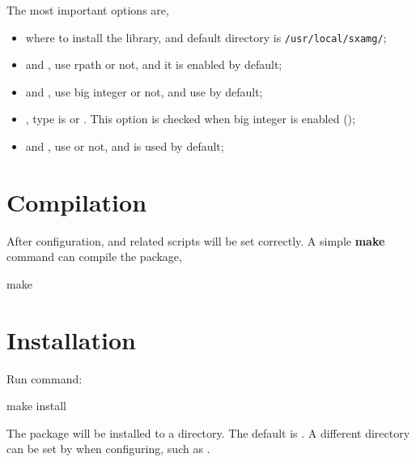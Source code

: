 The most important options are,
\begin{itemize}
    \item {} where to install the library, and default directory is \verb|/usr/local/sxamg/|;

    \item {} and , use rpath or not, and it is enabled by default;

    \item {} and , use big integer or not, and use  by default;

    \item {}, type is  or . This option is checked when big integer
        is enabled ();

    \item {} and , use  or not, and
         is used by default;

\end{itemize}

\section{Compilation}
After configuration,  and related scripts will be set correctly.
A simple {\color{blue}\textbf{make}} command can compile the package,

\begin{evb}
make
\end{evb}

\section{Installation}
Run command:
\begin{evb}
make install
\end{evb}
The package will be installed to a directory. The default is . 
A different directory can be set by  when configuring, 
such as .

